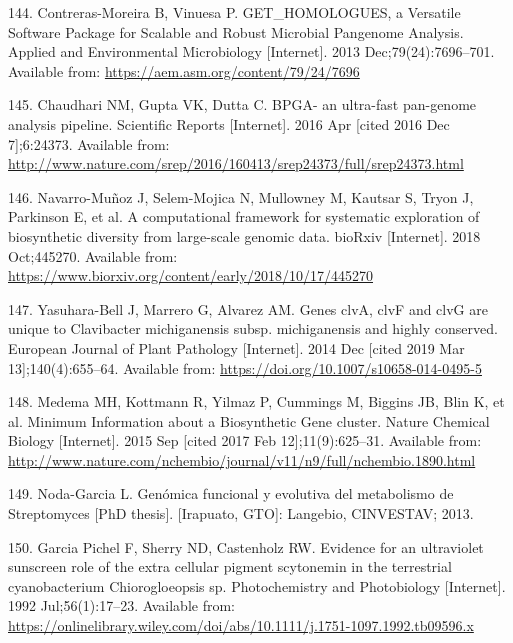 \documentclass[12pt,twoside]{reedthesis}
\begin{document}
  \hypertarget{ref-contreras-moreira_get_homologues_2013}{}
  144. Contreras-Moreira B, Vinuesa P. GET\_HOMOLOGUES, a Versatile
  Software Package for Scalable and Robust Microbial Pangenome Analysis.
  Applied and Environmental Microbiology {[}Internet{]}. 2013
  Dec;79(24):7696--701. Available from:
  \url{https://aem.asm.org/content/79/24/7696}
  
  \hypertarget{ref-chaudhari_bpga-_2016}{}
  145. Chaudhari NM, Gupta VK, Dutta C. BPGA- an ultra-fast pan-genome
  analysis pipeline. Scientific Reports {[}Internet{]}. 2016 Apr {[}cited
  2016 Dec 7{]};6:24373. Available from:
  \url{http://www.nature.com/srep/2016/160413/srep24373/full/srep24373.html}
  
  \hypertarget{ref-navarro-munoz_computational_2018}{}
  146. Navarro-Muñoz J, Selem-Mojica N, Mullowney M, Kautsar S, Tryon J,
  Parkinson E, et al. A computational framework for systematic exploration
  of biosynthetic diversity from large-scale genomic data. bioRxiv
  {[}Internet{]}. 2018 Oct;445270. Available from:
  \url{https://www.biorxiv.org/content/early/2018/10/17/445270}
  
  \hypertarget{ref-yasuhara-bell_genes_2014}{}
  147. Yasuhara-Bell J, Marrero G, Alvarez AM. Genes clvA, clvF and clvG
  are unique to Clavibacter michiganensis subsp. michiganensis and highly
  conserved. European Journal of Plant Pathology {[}Internet{]}. 2014 Dec
  {[}cited 2019 Mar 13{]};140(4):655--64. Available from:
  \url{https://doi.org/10.1007/s10658-014-0495-5}
  
  \hypertarget{ref-medema_minimum_2015}{}
  148. Medema MH, Kottmann R, Yilmaz P, Cummings M, Biggins JB, Blin K, et
  al. Minimum Information about a Biosynthetic Gene cluster. Nature
  Chemical Biology {[}Internet{]}. 2015 Sep {[}cited 2017 Feb
  12{]};11(9):625--31. Available from:
  \url{http://www.nature.com/nchembio/journal/v11/n9/full/nchembio.1890.html}
  
  \hypertarget{ref-cruz_tesis_2013}{}
  149. Noda-Garcia L. Genómica funcional y evolutiva del metabolismo de
  Streptomyces {[}PhD thesis{]}. {[}Irapuato, GTO{]}: Langebio, CINVESTAV;
  2013.
  
  \hypertarget{ref-garciapichel_evidence_1992}{}
  150. Garcia Pichel F, Sherry ND, Castenholz RW. Evidence for an
  ultraviolet sunscreen role of the extra cellular pigment scytonemin in
  the terrestrial cyanobacterium Chiorogloeopsis sp. Photochemistry and
  Photobiology {[}Internet{]}. 1992 Jul;56(1):17--23. Available from:
  \url{https://onlinelibrary.wiley.com/doi/abs/10.1111/j.1751-1097.1992.tb09596.x}
  
\end{document}
